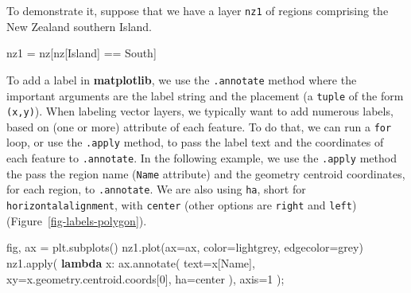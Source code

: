 \documentclass[
  letterpaper,
]{krantz}
\newenvironment{Shaded}{\begin{snugshade}}{\end{snugshade}}
\newcommand{\BuiltInTok}[1]{\textcolor[rgb]{0.00,0.23,0.31}{#1}}
\newcommand{\DecValTok}[1]{\textcolor[rgb]{0.68,0.00,0.00}{#1}}
\newcommand{\KeywordTok}[1]{\textcolor[rgb]{0.00,0.23,0.31}{\textbf{#1}}}
\newcommand{\NormalTok}[1]{\textcolor[rgb]{0.00,0.23,0.31}{#1}}
\newcommand{\OperatorTok}[1]{\textcolor[rgb]{0.37,0.37,0.37}{#1}}
\newcommand{\StringTok}[1]{\textcolor[rgb]{0.13,0.47,0.30}{#1}}
\begin{document}
To demonstrate it, suppose that we have a layer \texttt{nz1} of regions
comprising the New Zealand southern Island.

\begin{Shaded}
\begin{Highlighting}[]
\NormalTok{nz1 }\OperatorTok{=}\NormalTok{ nz[nz[}\StringTok{\textquotesingle{}Island\textquotesingle{}}\NormalTok{] }\OperatorTok{==} \StringTok{\textquotesingle{}South\textquotesingle{}}\NormalTok{]}
\end{Highlighting}
\end{Shaded}

To add a label in \textbf{matplotlib}, we use the \texttt{.annotate}
method where the important arguments are the label string and the
placement (a \texttt{tuple} of the form \texttt{(x,y)}). When labeling
vector layers, we typically want to add numerous labels, based on (one
or more) attribute of each feature. To do that, we can run a
\texttt{for} loop, or use the \texttt{.apply} method, to pass the label
text and the coordinates of each feature to \texttt{.annotate}. In the
following example, we use the \texttt{.apply} method the pass the region
name (\texttt{\textquotesingle{}Name\textquotesingle{}} attribute) and
the geometry centroid coordinates, for each region, to
\texttt{.annotate}. We are also using \texttt{ha}, short for
\texttt{horizontalalignment}, with
\texttt{\textquotesingle{}center\textquotesingle{}} (other options are
\texttt{\textquotesingle{}right\textquotesingle{}} and
\texttt{\textquotesingle{}left\textquotesingle{}})
(Figure~\ref{fig-labels-polygon}).

\begin{Shaded}
\begin{Highlighting}[]
\NormalTok{fig, ax }\OperatorTok{=}\NormalTok{ plt.subplots()}
\NormalTok{nz1.plot(ax}\OperatorTok{=}\NormalTok{ax, color}\OperatorTok{=}\StringTok{\textquotesingle{}lightgrey\textquotesingle{}}\NormalTok{, edgecolor}\OperatorTok{=}\StringTok{\textquotesingle{}grey\textquotesingle{}}\NormalTok{)}
\NormalTok{nz1.}\BuiltInTok{apply}\NormalTok{(}
    \KeywordTok{lambda}\NormalTok{ x: ax.annotate(}
\NormalTok{        text}\OperatorTok{=}\NormalTok{x[}\StringTok{\textquotesingle{}Name\textquotesingle{}}\NormalTok{], }
\NormalTok{        xy}\OperatorTok{=}\NormalTok{x.geometry.centroid.coords[}\DecValTok{0}\NormalTok{], }
\NormalTok{        ha}\OperatorTok{=}\StringTok{\textquotesingle{}center\textquotesingle{}}
\NormalTok{    ), }
\NormalTok{    axis}\OperatorTok{=}\DecValTok{1}
\NormalTok{)}\OperatorTok{;}
\end{Highlighting}
\end{Shaded}
\end{document}
